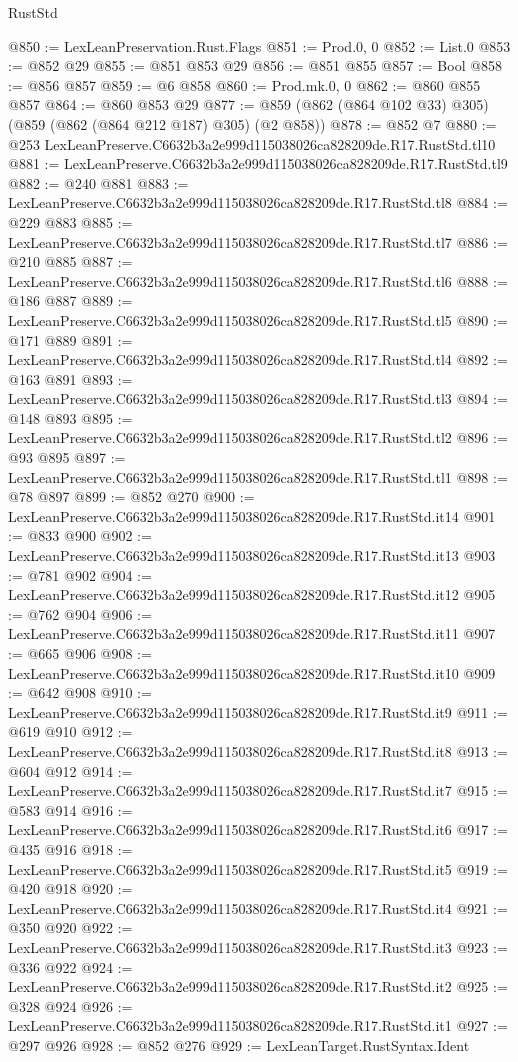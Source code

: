 \begin{lexlean}{RustStd}
\begin{coremodule}
@850 := LexLeanPreservation.Rust.Flags
@851 := Prod.{0, 0}
@852 := List.{0}
@853 := @852 @29
@855 := @851 @853 @29
@856 := @851 @855
@857 := Bool
@858 := @856 @857
@859 := @6 @858
@860 := Prod.mk.{0, 0}
@862 := @860 @855 @857
@864 := @860 @853 @29
@877 := @859 (@862 (@864 @102 @33) @305) (@859 (@862 (@864 @212 @187) @305) (@2 @858))
@878 := @852 @7
@880 := @253 LexLeanPreserve.C6632b3a2e999d115038026ca828209de.R17.RustStd.tl10
@881 := LexLeanPreserve.C6632b3a2e999d115038026ca828209de.R17.RustStd.tl9
@882 := @240 @881
@883 := LexLeanPreserve.C6632b3a2e999d115038026ca828209de.R17.RustStd.tl8
@884 := @229 @883
@885 := LexLeanPreserve.C6632b3a2e999d115038026ca828209de.R17.RustStd.tl7
@886 := @210 @885
@887 := LexLeanPreserve.C6632b3a2e999d115038026ca828209de.R17.RustStd.tl6
@888 := @186 @887
@889 := LexLeanPreserve.C6632b3a2e999d115038026ca828209de.R17.RustStd.tl5
@890 := @171 @889
@891 := LexLeanPreserve.C6632b3a2e999d115038026ca828209de.R17.RustStd.tl4
@892 := @163 @891
@893 := LexLeanPreserve.C6632b3a2e999d115038026ca828209de.R17.RustStd.tl3
@894 := @148 @893
@895 := LexLeanPreserve.C6632b3a2e999d115038026ca828209de.R17.RustStd.tl2
@896 := @93 @895
@897 := LexLeanPreserve.C6632b3a2e999d115038026ca828209de.R17.RustStd.tl1
@898 := @78 @897
@899 := @852 @270
@900 := LexLeanPreserve.C6632b3a2e999d115038026ca828209de.R17.RustStd.it14
@901 := @833 @900
@902 := LexLeanPreserve.C6632b3a2e999d115038026ca828209de.R17.RustStd.it13
@903 := @781 @902
@904 := LexLeanPreserve.C6632b3a2e999d115038026ca828209de.R17.RustStd.it12
@905 := @762 @904
@906 := LexLeanPreserve.C6632b3a2e999d115038026ca828209de.R17.RustStd.it11
@907 := @665 @906
@908 := LexLeanPreserve.C6632b3a2e999d115038026ca828209de.R17.RustStd.it10
@909 := @642 @908
@910 := LexLeanPreserve.C6632b3a2e999d115038026ca828209de.R17.RustStd.it9
@911 := @619 @910
@912 := LexLeanPreserve.C6632b3a2e999d115038026ca828209de.R17.RustStd.it8
@913 := @604 @912
@914 := LexLeanPreserve.C6632b3a2e999d115038026ca828209de.R17.RustStd.it7
@915 := @583 @914
@916 := LexLeanPreserve.C6632b3a2e999d115038026ca828209de.R17.RustStd.it6
@917 := @435 @916
@918 := LexLeanPreserve.C6632b3a2e999d115038026ca828209de.R17.RustStd.it5
@919 := @420 @918
@920 := LexLeanPreserve.C6632b3a2e999d115038026ca828209de.R17.RustStd.it4
@921 := @350 @920
@922 := LexLeanPreserve.C6632b3a2e999d115038026ca828209de.R17.RustStd.it3
@923 := @336 @922
@924 := LexLeanPreserve.C6632b3a2e999d115038026ca828209de.R17.RustStd.it2
@925 := @328 @924
@926 := LexLeanPreserve.C6632b3a2e999d115038026ca828209de.R17.RustStd.it1
@927 := @297 @926
@928 := @852 @276
@929 := LexLeanTarget.RustSyntax.Ident

\end{coremodule}
\end{lexlean}
